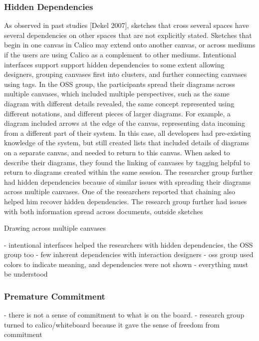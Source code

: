 \subsubsection{Hidden Dependencies}
As observed in past studies [Dekel 2007], sketches that cross several spaces have several dependencies on other spaces that are not explicitly stated. Sketches that begin in one canvas in Calico may extend onto another canvas, or across mediums if the users are using Calico as a complement to other mediums. Intentional interfaces support support hidden dependencies to some extent allowing designers, grouping canvases first into clusters, and further connecting canvases using tags. In the OSS group, the participants spread their diagrams across multiple canvases, which included multiple perspectives, such as the same diagram with different details revealed, the same concept represented using different notations, and different pieces of larger diagrams. For example, a diagram included arrows at the edge of the canvas, representing data incoming from a different part of their system. In this case, all developers had pre-existing knowledge of the system, but still created lists that included details of diagrams on a separate canvas, and needed to return to this canvas. When asked to describe their diagrams, they found the linking of canvases by tagging helpful to return to diagrams created within the same session. The researcher group further had hidden dependencies because of similar issues with spreading their diagrams across multiple canvases. One of the researchers reported that chaining also helped him recover hidden dependencies. The research group further had issues with both information spread across documents, outside sketches

Drawing across multiple canvases 

- intentional interfaces helped the researchers with hidden dependencies, the OSS group too
- few inherent dependencies with interaction designers
- oss group used colors to indicate meaning, and dependencies were not shown
- everything must be understood


\subsubsection{Premature Commitment}

- there is not a sense of commitment to what is on the board.
- research group turned to calico/whiteboard because it gave the sense of freedom from commitment

